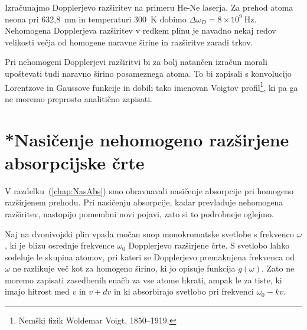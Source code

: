 Izračunajmo Dopplerjevo razširitev na primeru He-Ne laserja. Za prehod
atoma neona pri 632,8~nm in temperaturi 300~K dobimo 
$\Delta\omega_{D}=8\times10^{9}~\si{\hertz}$. Nehomogena Dopplerjeva razširitev v 
redkem plinu je navadno nekaj redov velikosti večja od homogene naravne širine in 
razširitve zaradi trkov.

\begin{remark}
Pri nehomogeni Dopplerjevi razširitvi bi za bolj natančen izračun morali upoštevati 
tudi naravno širino posameznega atoma. To bi zapisali s konvolucijo Lorentzove
in Gaussove funkcije in dobili tako imenovan Voigtov 
profil\footnote{Nemški fizik Woldemar Voigt, 1850--1919.}, ki pa ga ne moremo 
preprosto analitično zapisati.
\end{remark}


\section{*Nasičenje nehomogeno razširjene absorpcijske črte}
V razdelku~(\ref{chap:NasAbs}) smo obravnavali nasičenje absorpcije pri homogeno 
razširjenem prehodu. Pri nasičenju absorpcije, kadar prevladuje nehomogena razširitev,
nastopijo pomembni novi pojavi, zato si to podrobneje oglejmo.

Naj na dvonivojski plin vpada močan snop monokromatske svetlobe s frekvenco $\omega$,
ki je blizu osrednje frekvence $\omega_{0}$ Dopplerjevo razširjene črte. S svetlobo
lahko sodeluje le skupina atomov, pri kateri se Dopplerjevo premaknjena
frekvenca od $\omega$ ne razlikuje več kot za homogeno širino, ki
jo opisuje funkcija $g(\omega)$. Zato ne moremo zapisati zasedbenih
enačb za vse atome hkrati, ampak le za tiste, ki imajo hitrost med
$v$ in $v+dv$ in ki absorbirajo svetlobo pri frekvenci $\omega_{0}-kv$.

